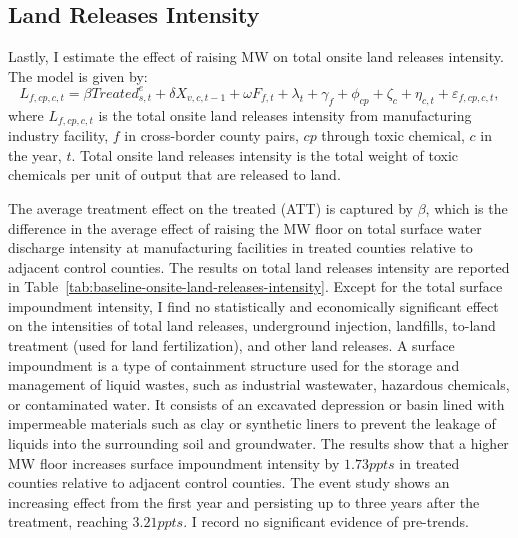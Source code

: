 \documentclass[12pt, english]{article}
\begin{document}
    \subsection{Land Releases Intensity}\label{subsec:land-releases-intensity}
    Lastly, I estimate the effect of raising MW on total onsite land releases intensity. The model is given by:
    \begin{equation}
        L_{f,cp,c,t} = \beta Treated_{s,t}^e + \delta X_{v,c,t-1} + \omega F_{f,t} + \lambda_{t} + \gamma_{f} + \phi_{cp} + \zeta_{c} + \eta_{c,t} + \varepsilon_{f,cp,c,t},\label{eq:baseline-onsite-land-releases-intensity}
    \end{equation}
    where $L_{f,cp,c,t}$ is the total onsite land releases intensity from manufacturing industry facility, $f$ in cross-border county pairs, $cp$ through toxic chemical, $c$ in the year, $t$. Total onsite land releases intensity is the total weight of toxic chemicals per unit of output that are released to land.
    

    The average treatment effect on the treated (ATT) is captured by $\beta$, which is the difference in the average effect of raising the MW floor on total surface water discharge intensity at manufacturing facilities in treated counties relative to adjacent control counties. The results on total land releases intensity are reported in Table~\ref{tab:baseline-onsite-land-releases-intensity}. Except for the total surface impoundment intensity, I find no statistically and economically significant effect on the intensities of total land releases, underground injection, landfills, to-land treatment (used for land fertilization), and other land releases. A surface impoundment is a type of containment structure used for the storage and management of liquid wastes, such as industrial wastewater, hazardous chemicals, or contaminated water. It consists of an excavated depression or basin lined with impermeable materials such as clay or synthetic liners to prevent the leakage of liquids into the surrounding soil and groundwater. The results show that a higher MW floor increases surface impoundment intensity by $1.73ppts$ in treated counties relative to adjacent control counties. The event study shows an increasing effect from the first year and persisting up to three years after the treatment, reaching $3.21ppts$. I record no significant evidence of pre-trends.
    


%    
%    
%    
\end{document}
